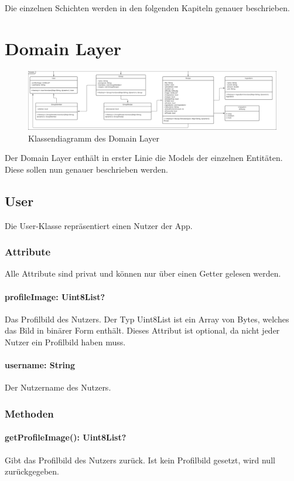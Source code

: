 \documentclass[parskip=full]{scrartcl}
\newcommand{\changelocaltocdepth}[1]{%
  \addtocontents{toc}{\protect\setcounter{tocdepth}{#1}}%
  \setcounter{tocdepth}{#1}%
}
\begin{document}
Die einzelnen Schichten werden in den folgenden Kapiteln genauer beschrieben.

\newpage

\section{Domain Layer}
\changelocaltocdepth{2}
\begin{figure}[htp]
    \centering
    \includegraphics[width = \textwidth]{images/domainLayer/domainLayer.pdf}
    \caption{Klassendiagramm des Domain Layer}
    \label{fig:domain-layer}
\end{figure}
Der Domain Layer enthält in erster Linie die Models der einzelnen Entitäten. Diese sollen nun genauer beschrieben werden.
\subsection{User}
Die User-Klasse repräsentiert einen Nutzer der App.
\subsubsection{Attribute}
Alle Attribute sind privat und können nur über einen Getter gelesen werden.
\paragraph{profileImage: Uint8List?}
Das Profilbild des Nutzers. Der Typ Uint8List ist ein Array von Bytes, welches das Bild in binärer Form enthält. Dieses Attribut ist optional, da nicht jeder Nutzer ein Profilbild haben muss.
\paragraph{username: String}
Der Nutzername des Nutzers.

\subsubsection{Methoden}
\paragraph{getProfileImage(): Uint8List?}
Gibt das Profilbild des Nutzers zurück. Ist kein Profilbild gesetzt, wird null zurückgegeben.
\end{document}
